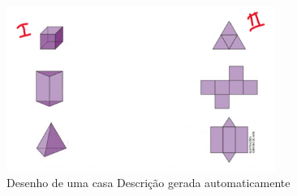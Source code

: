 \begin{escolha}
\begin{boxmedio}
\begin{boxmedio}
{\begin{boxpeq}
\begin{boxpeq}
{\begin{boxpeq}
\begin{boxmedio}
\begin{boxmedio}
\begin{boxpeq}
\begin{boxmedio}
\begin{boxpeq}
\begin{boxpeq}
\begin{boxpeq}
\begin{boxpeq}
\begin{boxmedio}
{\begin{boxmedio}
\begin{boxmedio}
\begin{boxpeq}
\begin{boxmedio}
\begin{boxpeq}
\begin{boxpeq}
\begin{boxpeq}
\begin{escolha}
{\begin{boxmedio}
\begin{boxpeq}
\begin{boxpeq}
\begin{boxpeq}
\begin{boxpeq}
\begin{boxpeq}
\begin{boxmedio}
\begin{boxpeq}
\begin{boxpeq}
\begin{boxpeq}
{\begin{boxpeq}
\begin{boxmedio}
\begin{boxpeq}
\begin{boxpeq}
\begin{boxpeq}
{\begin{boxpeq}
\begin{boxmedio}
{\begin{boxpeq}
\begin{boxpeq}
\begin{boxmedio}
\begin{boxmedio}
\begin{boxpeq}
\begin{boxpeq}
{\begin{boxpeq}
\begin{boxpeq}
\begin{boxpeq}
\begin{boxpeq}
\begin{figure}
\centering
\includegraphics[width=3.45in,height=2.11404in]{./_SAEB_9_MAT/media/image167.png}
\caption{Desenho de uma casa Descrição gerada automaticamente}
\end{figure}




\end{boxpeq}
\end{boxpeq}
\end{boxpeq}
\end{boxpeq}}
\end{boxpeq}
\end{boxpeq}
\end{boxmedio}
\end{boxmedio}
\end{boxpeq}
\end{boxpeq}}
\end{boxmedio}
\end{boxpeq}}
\end{boxpeq}
\end{boxpeq}
\end{boxpeq}
\end{boxmedio}
\end{boxpeq}}
\end{boxpeq}
\end{boxpeq}
\end{boxpeq}
\end{boxmedio}
\end{boxpeq}
\end{boxpeq}
\end{boxpeq}
\end{boxpeq}
\end{boxpeq}
\end{boxmedio}}
\end{escolha}
\end{boxpeq}
\end{boxpeq}
\end{boxpeq}
\end{boxmedio}
\end{boxpeq}
\end{boxmedio}
\end{boxmedio}}
\end{boxmedio}
\end{boxpeq}
\end{boxpeq}
\end{boxpeq}
\end{boxpeq}
\end{boxmedio}
\end{boxpeq}
\end{boxmedio}
\end{boxmedio}
\end{boxpeq}}
\end{boxpeq}
\end{boxpeq}}
\end{boxmedio}
\end{boxmedio}
\end{escolha}

